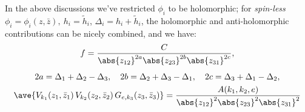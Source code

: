 \documentclass[a4paper,10pt]{article}
\begin{document}
\begin{enumerate}
\begin{enumerate}
	In the above discussions we've restricted $\phi_i$ to be holomorphic; for \textit{spin-less} $
		\phi_i = \phi_i(z,\bar{z}),\ %
		h_i = \tilde{h}_i$, $
		\Delta_i = h_i + \tilde{h}_i
	$, the holomorphic and anti-holomorphic contributions can be nicely combined, and we have:
	\begin{gather}
		f = \frac{C}{
			\abs{z_{12}}^{2a}
			\abs{z_{23}}^{2b}
			\abs{z_{31}}^{2c}
		},\\[1ex]
		2a = \Delta_1 + \Delta_2 - \Delta_3,\quad
		2b = \Delta_2 + \Delta_3 - \Delta_1,\quad
		2c = \Delta_3 + \Delta_1 - \Delta_2,\\
		\ave{
			V_{k_1}(z_1,\bar{z}_1)\,
			V_{k_2}(z_2,\bar{z}_2)\,
			G_{e,k_3}(z_3,\bar{z}_3)
		}
		= \frac{A(k_1,k_2,e)}{
			\abs{z_{12}}^{2}
			\abs{z_{23}}^{2}
			\abs{z_{31}}^{2}
		}
	\end{gather}
	

\end{enumerate}
\end{enumerate}
\end{document}
